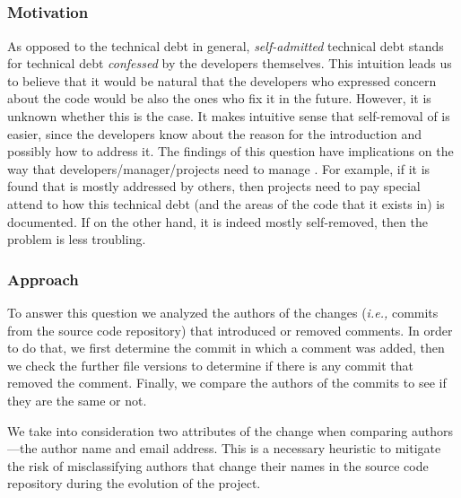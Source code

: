 \subsection*{\rqii}

\subsubsection*{Motivation} As opposed to the technical debt in general, \emph{self-admitted} technical debt stands for technical debt \emph{confessed} by the developers themselves. This intuition leads us to believe that it would be natural that the developers who expressed concern about the code would be also the ones who fix it in the future. However, it is unknown whether this is the case. It makes intuitive sense that self-removal of \SATD is easier, since the developers know about the reason for the \SATD introduction and possibly how to address it. The findings of this question have implications on the way that developers/manager/projects need to manage \SATD. For example, if it is found that \SATD is mostly addressed by others, then projects need to pay special attend to how this technical debt (and the areas of the code that it exists in) is documented. If on the other hand, it is indeed mostly self-removed, then the problem is less troubling.




\subsubsection*{Approach} To answer this question we analyzed the authors of the changes (\textit{i.e.,} commits from the source code repository) that introduced or removed \SATD comments. In order to do that, we first determine the commit in which a \SATD comment was added, then we check the further file versions to determine if there is any commit that removed the \SATD comment. Finally, we compare the authors of the commits to see if they are the same or not. 

We take into consideration two attributes of the change when comparing authors---the author name and email address. This is a necessary heuristic to mitigate the risk of misclassifying authors that change their names in the source code repository during the evolution of the project.  %


